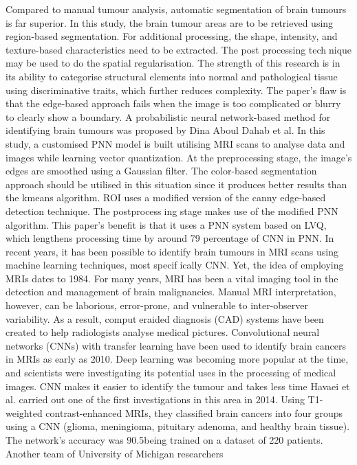 Compared to manual tumour analysis, automatic segmentation
of brain tumours is far superior. In this study, the brain tumour
areas are to be retrieved using region-based segmentation. For
additional processing, the shape, intensity, and texture-based
characteristics need to be extracted. The post processing technique may be used to do the spatial regularisation. The strength
of this research is in its ability to categorise structural elements
into normal and pathological tissue using discriminative traits,
which further reduces complexity. The paper’s flaw is that the
edge-based approach fails when the image is too complicated
or blurry to clearly show a boundary.
A probabilistic neural network-based method for identifying
brain tumours was proposed by Dina Aboul Dahab et al. In this
study, a customised PNN model is built utilising MRI scans
to analyse data and images while learning vector quantization.
At the preprocessing stage, the image’s edges are smoothed
using a Gaussian filter. The color-based segmentation approach
should be utilised in this situation since it produces better
results than the kmeans algorithm. ROI uses a modified version
of the canny edge-based detection technique. The postprocessing stage makes use of the modified PNN algorithm. This
paper’s benefit is that it uses a PNN system based on LVQ,
which lengthens processing time by around 79 percentage of
CNN in PNN.
In recent years, it has been possible to identify brain tumours
in MRI scans using machine learning techniques, most specifically CNN. Yet, the idea of employing MRIs dates to 1984.
For many years, MRI has been a vital imaging tool in the
detection and management of brain malignancies. Manual MRI
interpretation, however, can be laborious, error-prone, and
vulnerable to inter-observer variability. As a result, computeraided diagnosis (CAD) systems have been created to help
radiologists analyse medical pictures.
Convolutional neural networks (CNNs) with transfer learning
have been used to identify brain cancers in MRIs as early
as 2010. Deep learning was becoming more popular at the
time, and scientists were investigating its potential uses in the
processing of medical images. CNN makes it easier to identify
the tumour and takes less time
Havaei et al. carried out one of the first investigations in this
area in 2014. Using T1- weighted contrast-enhanced MRIs,
they classified brain cancers into four groups using a CNN
(glioma, meningioma, pituitary adenoma, and healthy brain
tissue). The network’s accuracy was 90.5being trained on a
dataset of 220 patients.
Another team of University of Michigan researchers
